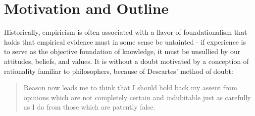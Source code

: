 \section{Motivation and Outline}

Historically, empiricism is often associated with a flavor of
foundationalism that holds that empirical evidence must in some sense be
untainted - if experience is to serve as the objective foundation of
knowledge, it must be unsullied by our attitudes, beliefs, and values.
It is without a doubt motivated by a conception of rationality familiar
to philosophers, because of Descartes' method of doubt:

\begin{quote}
Reason now leads me to think that I should hold back my
assent from opinions which are not completely certain and indubitable
just as carefully as I do from those which are patently false.\cite{med}
\end{quote}
